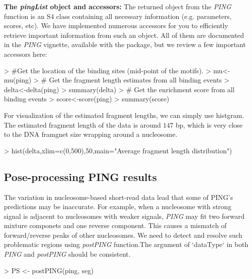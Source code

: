 \documentclass[12pt]{article}
\newcommand{\Rfunction}[1]{{\textit{#1}}}
\newcommand{\Rclass}[1]{{\textit{#1}}}
\begin{document}
\noindent\textbf{The \Rclass{pingList} object and accessors:}
The returned object from the \Rfunction{PING} function is an S4 class containing all necessary information (e.g. parameters, scores, etc). We have implemented numerous accessors for you to efficiently retrieve important information from such an object. All of them are documented in the \Rfunction{PING} vignette, available with the package, but we review a few important accessors here:
\begin{Schunk}
\begin{Sinput}
> #Get the location of the binding sites (mid-point of the motifs).
> mu<-mu(ping)
> # Get the fragment length estimates from all binding events
> delta<-delta(ping)
> summary(delta)
> # Get the enrichment score from all binding events
> score<-score(ping)
> summary(score)
\end{Sinput}
\end{Schunk}

For visualization of the estimated fragment lengths, we can simply use histgram. The estimated fragment length of the data is around $147$ bp, which is very close to the DNA framgnet size wrapping around a nucleosome.
 
\begin{Schunk}
\begin{Sinput}
> hist(delta,xlim=c(0,500),50,main="Average fragment length distribution")
\end{Sinput}
\end{Schunk}

\subsection{Pose-processing PING results}

The variation in nucleosome-based short-read data lead that some of PING's predictions may be inaccurate. For example, when a nucleosome with strong signal is adjacent to nucleosomes with weaker signals, \Rclass{PING} may fit two forward mixture componets and one reverse component. This causes a mismatch of forward/reverse peaks of other nucleosomes. We need to detect and resolve such problematic regions using \Rfunction{postPING} function.The argument of `dataType` in both \Rfunction{PING} and \Rfunction{postPING} should be consistent.

\begin{Schunk}
\begin{Sinput}
> PS <- postPING(ping, seg)
\end{Sinput}
\end{Schunk}
\end{document}

